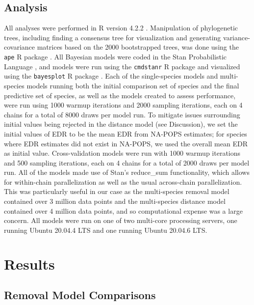 \documentclass[12pt]{article}
\begin{document}
\subsection{Analysis}
\par All analyses were performed in R version 4.2.2 \citep{r_core_team_r_2022}.
Manipulation of phylogenetic trees, including finding a consensus tree for visualization and generating variance-covariance matrices based on the 2000 bootstrapped trees, was done using the \texttt{ape} R package \citep{paradis_ape_2019}.
All Bayesian models were coded in the Stan Probabilistic Language \cite{stan_development_team_stan_2019}, and models were run using the \texttt{cmdstanr} R package \citep{gabry_cmdstanr_2022} and visualized using the \texttt{bayesplot} R package \citep{gabry_visualization_2019}.
Each of the single-species models and multi-species models running both the initial comparison set of species and the final predictive set of species, as well as the models created to assess performance, were run using 1000 warmup iterations and 2000 sampling iterations, each on 4 chains for a total of 8000 draws per model run.
To mitigate issues surrounding initial values being rejected in the distance model (see Discussion), we set the initial values of EDR to be the mean EDR from NA-POPS estimates; for species where EDR estimates did not exist in NA-POPS, we used the overall mean EDR as initial value.
Cross-validation models were run with 1000 warmup iterations and 500 sampling iterations, each on 4 chains for a total of 2000 draws per model run.
All of the models made use of Stan's reduce\_sum functionality, which allows for within-chain parallelization as well as the usual across-chain parallelization.
This was particularly useful in our case as the multi-species removal model contained over 3 million data points and the multi-species distance model contained over 4 million data points, and so computational expense was a large concern.
All models were run on one of two multi-core processing servers, one running Ubuntu 20.04.4 LTS and one running Ubuntu 20.04.6 LTS.


\section{Results}
\subsection{Removal Model Comparisons}
\end{document}
